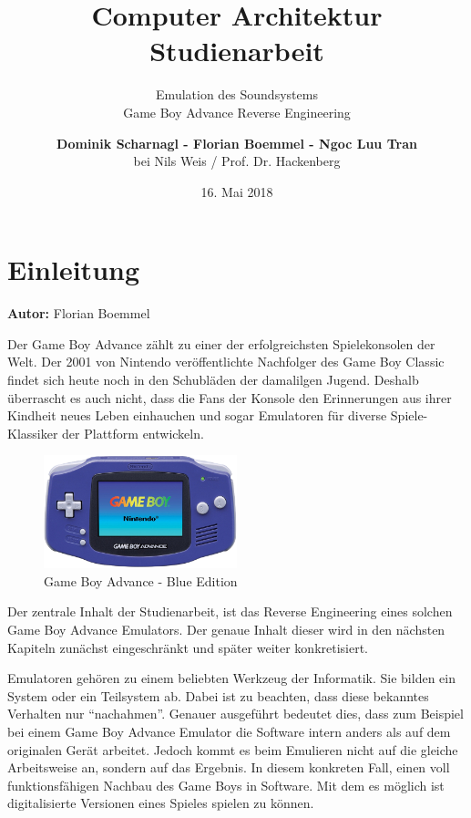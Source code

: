 \documentclass[11pt,a4paper]{scrartcl}
\title{\vspace{5cm}\huge Computer Architektur \\ \Large Studienarbeit \vspace{1cm}}
\subtitle{\Huge Emulation des Soundsystems \\ \Large Game Boy Advance Reverse Engineering \vspace{1cm}}
\author{\large \textbf{Dominik Scharnagl - Florian Boemmel - Ngoc Luu Tran}\\ \normalsize bei Nils Weis / Prof. Dr. Hackenberg}
\date{\normalsize 16. Mai 2018}
\newcommand{\AutorFlorian} {
    \vspace{-4mm}
    \large \textbf{Autor:} Florian Boemmel \normalsize
    \vspace{2mm}
}
\begin{document}
\sffamily

\maketitle
\thispagestyle{empty}
\clearpage

\setcounter{page}{1}


\tableofcontents
\clearpage
{}


\printindex
\clearpage


\section{Einleitung} \label{Einleitung}
\AutorFlorian

Der Game Boy Advance z\"ahlt zu einer der erfolgreichsten Spielekonsolen der Welt. Der 2001 von Nintendo \cite{NintendoGeschichte} ver\"offentlichte Nachfolger des Game Boy Classic findet sich heute noch in den Schubl\"aden der damalilgen Jugend. Deshalb \"uberrascht es auch nicht, dass die Fans der Konsole den Erinnerungen aus ihrer Kindheit neues Leben einhauchen und sogar Emulatoren f\"ur diverse Spiele-Klassiker der Plattform entwickeln.

\begin{figure}[h]
    \centering
    \includegraphics[width=0.5\textwidth]{GameBoyAdvance}
    \caption{Game Boy Advance - Blue Edition}
    \label{fig:gba}
\end{figure}

Der zentrale Inhalt der Studienarbeit, ist das Reverse Engineering eines solchen Game Boy Advance Emulators. Der genaue Inhalt dieser wird in den n\"achsten Kapiteln zun\"achst eingeschr\"ankt und sp\"ater weiter konkretisiert.

Emulatoren geh\"oren zu einem beliebten Werkzeug der Informatik. Sie bilden ein System oder ein Teilsystem ab. Dabei ist zu beachten, dass diese bekanntes Verhalten nur \enquote{nachahmen}. Genauer ausgef\"uhrt bedeutet dies, dass zum Beispiel bei einem Game Boy Advance Emulator die Software intern anders als auf dem originalen Ger\"at arbeitet. Jedoch kommt es beim Emulieren nicht auf die gleiche Arbeitsweise an, sondern auf das Ergebnis. In diesem konkreten Fall, einen voll funktionsf\"ahigen Nachbau des Game Boys in Software. Mit dem es m\"oglich ist digitalisierte Versionen eines Spieles spielen zu k\"onnen.\newline
\end{document}
